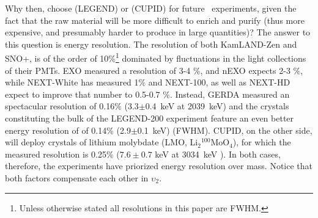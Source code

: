 Why then, choose  (LEGEND) or  (CUPID) for future \bbonu\ experiments, given the fact that the raw material will be more difficult to enrich and purify (thus more expensive, and presumably harder to produce in large quantities)? %
%
The answer to this question is energy resolution. The resolution of both KamLAND-Zen and SNO+, is of the order of 10\%\footnote{Unless otherwise stated all resolutions in this paper are FWHM.} dominated by fluctuations in the light collections of their PMTs. EXO measured a resolution of 3-4 \%, and nEXO expects 2-3 \%, while NEXT-White has measured 1\% and NEXT-100, as well as NEXT-HD expect to improve that number to 0.5-0.7 \%. Instead, 
GERDA measured an spectacular resolution of 0.16\% (3.3$\pm$0.4~keV at 2039~keV\cite{GERDA:2020xhi}) and the crystals constituting the bulk of the LEGEND-200 experiment feature an even better energy resolution of of 0.14\% (2.9$\pm$0.1~keV)  (FWHM). CUPID, on the other side, will deploy crystals of 
lithium molybdate (LMO, Li$_2$$^{100}$MoO$_4$), for which the measured resolution is 0.25\% ($7.6 \pm 0.7$ keV at  3034~keV \cite{CUPID:2020aow}). In both cases, therefore, the experiments have priorized energy resolution over mass. Notice that both factors compensate each other in $\upsilon_2$. 






